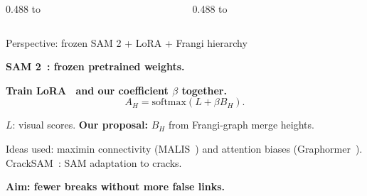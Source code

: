 \documentclass[final]{beamer}
\newcommand{\smalltext}{\fontsize{27}{31}\selectfont}
\newcommand{\tikzfigure}[2]{\resizebox{#1}{!}{}}
\newlength{\leftcolumnheight}\newlength{\rightcolumnheight}\newlength{\maincolumnheight}
\begin{document}
\begin{frame}[t]
\setlength{\leftcolumnheight}{\dimexpr\ht\fusepanel+\dp\fusepanel+\ht\linkpanel+\dp\linkpanel+\ht\centerpanel+\dp\centerpanel+\ht\palaispanel+\dp\palaispanel+3\posterblockgap\relax}
\setlength{\rightcolumnheight}{\dimexpr\ht\accuracypanel+\dp\accuracypanel+\ht\noisepanel+\dp\noisepanel+\ht\geologypanel+\dp\geologypanel+2\posterblockgap\relax}
\setlength{\maincolumnheight}{\leftcolumnheight}
\ifdim\rightcolumnheight>\maincolumnheight\setlength{\maincolumnheight}{\rightcolumnheight}\fi
\begin{columns}[T,onlytextwidth]
\begin{column}{0.488\textwidth}
\vbox to \maincolumnheight{\offinterlineskip
  \hbox{\usebox{\fusepanel}}\vfil
  \hbox{\usebox{\linkpanel}}\vfil
  \hbox{\usebox{\centerpanel}}\vfil
  \hbox{\usebox{\palaispanel}}\kern0pt}
\end{column}
\begin{column}{0.488\textwidth}
\vbox to \maincolumnheight{\offinterlineskip
  \hbox{\usebox{\accuracypanel}}\vfil
  \hbox{\usebox{\noisepanel}}\vfil
  \hbox{\usebox{\geologypanel}}\kern0pt}
\end{column}
\end{columns}
\vspace{\posterblockgap}

\begin{block}{Perspective: frozen SAM 2 + LoRA + Frangi hierarchy}
\begin{minipage}[c]{0.56\linewidth}
  \centering\tikzfigure{0.98\linewidth}{foundation-hierarchy}
\end{minipage}\hfill
\begin{minipage}[c]{0.415\linewidth}\RaggedRight
  \textbf{SAM 2~\cite{ravi2025sam2}: frozen pretrained weights.}\par
  \textbf{Train LoRA~\cite{hu2022lora} and our coefficient $\beta$ together.}
  \[A_H=\mathrm{softmax}(L+\beta B_H).\]
  {\smalltext $L$: visual scores. \textbf{Our proposal:} $B_H$ from Frangi-graph merge heights.\par
  Ideas used: maximin connectivity (MALIS~\cite{turaga2009malis}) and attention biases
  (Graphormer~\cite{ying2021graphormer}).
  CrackSAM~\cite{ge2024cracksam}: SAM adaptation to cracks.\par
  \textbf{Aim: fewer breaks without more false links.}}
\end{minipage}
\end{block}


\end{frame}
\end{document}
